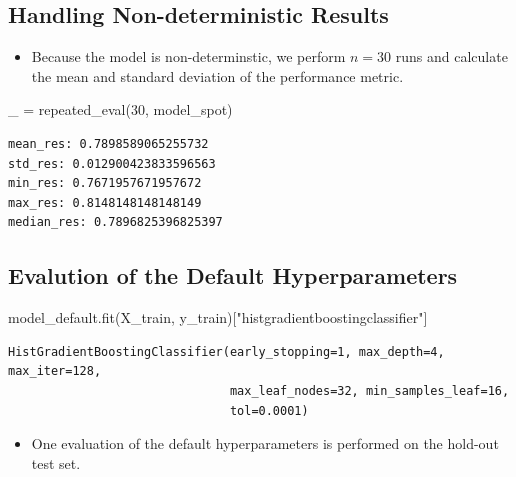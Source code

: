 \documentclass[
  letterpaper,
  DIV=11,
  numbers=noendperiod]{scrreprt}
\newenvironment{Shaded}{\begin{snugshade}}{\end{snugshade}}
\newcommand{\DecValTok}[1]{\textcolor[rgb]{0.68,0.00,0.00}{#1}}
\newcommand{\NormalTok}[1]{\textcolor[rgb]{0.00,0.23,0.31}{#1}}
\newcommand{\OperatorTok}[1]{\textcolor[rgb]{0.37,0.37,0.37}{#1}}
\newcommand{\StringTok}[1]{\textcolor[rgb]{0.13,0.47,0.30}{#1}}
\providecommand{\tightlist}{%
  \setlength{\itemsep}{0pt}\setlength{\parskip}{0pt}}\usepackage{longtable,booktabs,array}
\begin{document}
\hypertarget{handling-non-deterministic-results-1}{%
\subsection{Handling Non-deterministic
Results}\label{handling-non-deterministic-results-1}}

\begin{itemize}
\tightlist
\item
  Because the model is non-determinstic, we perform \(n=30\) runs and
  calculate the mean and standard deviation of the performance metric.
\end{itemize}

\begin{Shaded}
\begin{Highlighting}[]
\NormalTok{\_ }\OperatorTok{=}\NormalTok{ repeated\_eval(}\DecValTok{30}\NormalTok{, model\_spot)}
\end{Highlighting}
\end{Shaded}

\begin{verbatim}
mean_res: 0.7898589065255732
std_res: 0.012900423833596563
min_res: 0.7671957671957672
max_res: 0.8148148148148149
median_res: 0.7896825396825397
\end{verbatim}

\hypertarget{evalution-of-the-default-hyperparameters-1}{%
\subsection{Evalution of the Default
Hyperparameters}\label{evalution-of-the-default-hyperparameters-1}}

\begin{Shaded}
\begin{Highlighting}[]
\NormalTok{model\_default.fit(X\_train, y\_train)[}\StringTok{"histgradientboostingclassifier"}\NormalTok{]}
\end{Highlighting}
\end{Shaded}

\begin{verbatim}
HistGradientBoostingClassifier(early_stopping=1, max_depth=4, max_iter=128,
                               max_leaf_nodes=32, min_samples_leaf=16,
                               tol=0.0001)
\end{verbatim}

\begin{itemize}
\tightlist
\item
  One evaluation of the default hyperparameters is performed on the
  hold-out test set.
\end{itemize}
\end{document}

